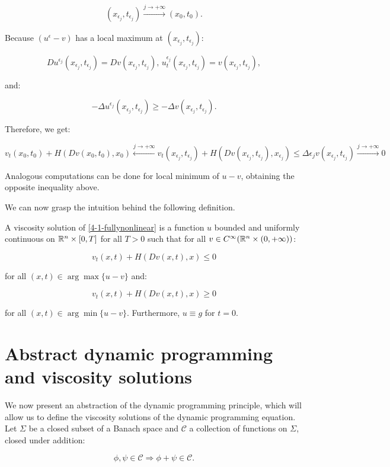 \[(x_{\epsilon_j},t_{\epsilon_j})\xrightarrow{j\to+\infty}(x_0,t_0).\]

Because $(u^{\epsilon}-v)$ has a local maximum at $(x_{\epsilon_j},t_{\epsilon_j})$:

\[Du^{\epsilon_j}(x_{\epsilon_j},t_{\epsilon_j})=Dv(x_{\epsilon_j},t_{\epsilon_j}),\,u^{\epsilon_j}_t(x_{\epsilon_j},t_{\epsilon_j}) =v(x_{\epsilon_j},t_{\epsilon_j}),\]

and:

\[-\Delta u^{\epsilon_j}(x_{\epsilon_j},t_{\epsilon_j}) \geq -\Delta v(x_{\epsilon_j},t_{\epsilon_j}).\]

Therefore, we get:

\[v_t(x_0,t_0)+H(Dv(x_0,t_0),x_0)\xleftarrow{j\to+\infty}v_t(x_{\epsilon_j},t_{\epsilon_j}) +H(Dv(x_{\epsilon_j},t_{\epsilon_j}) ,x_{\epsilon_j})\leq \Delta \epsilon_jv(x_{\epsilon_j},t_{\epsilon_j}) \xrightarrow{j\to+\infty}0\]

Analogous computations can be done for local minimum of $u-v$, obtaining the opposite inequality above.

We can now grasp the intuition behind the following definition.

\begin{definition}
    A viscosity solution of \ref{4-1-fullynonlinear} is a function $u$ bounded and uniformly continuous on $\mathbb{R}^n\times[0,T]$ for all $T>0$ such that 
    for all $v\in C^{\infty}(\mathbb{R}^n\times(0,+\infty))$:

    \[v_t(x,t)+H(Dv(x,t),x)\leq0\]

    for all $(x,t)\in\arg \max\{u-v\}$ and:

    \[v_t(x,t)+H(Dv(x,t),x)\geq0\]

    for all $(x,t)\in\arg \min\{u-v\}$. Furthermore, $u\equiv g$ for $t=0$. 
\end{definition}

\section{Abstract dynamic programming and viscosity solutions}

We now present an abstraction of the dynamic programming principle, which will allow us to define the viscosity solutions of the dynamic programming 
equation. Let $\Sigma$ be a closed subset of a Banach space and $\mathcal{C}$ a collection of functions on $\Sigma$, closed under addition:

\[\phi,\psi\in\mathcal{C}\Rightarrow \phi+\psi\in\mathcal{C}.\]

